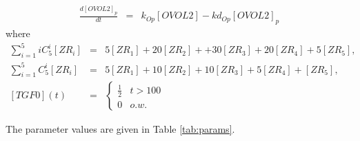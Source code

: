 \documentclass{article}
\begin{document}
{\begin{eqnarray*}
		\frac{d\left[OVOL2\right]_{p}}{dt} & = & k_{Op}\left[OVOL2\right]-kd_{Op}\left[OVOL2\right]_{p}
	\end{eqnarray*}
} where{\footnotesize{}
\begin{eqnarray*}
	\sum_{i=1}^{5}iC_{5}^{i}\left[ZR_{i}\right] & = & 5\left[ZR_{1}\right]+20\left[ZR_{2}\right]++30\left[ZR_{3}\right]+20\left[ZR_{4}\right]+5\left[ZR_{5}\right],\\
	\sum_{i=1}^{5}C_{5}^{i}\left[ZR_{i}\right] & = & 5\left[ZR_{1}\right]+10\left[ZR_{2}\right]+10\left[ZR_{3}\right]+5\left[ZR_{4}\right]+\left[ZR_{5}\right],\\
	\left[TGF0\right](t) & = & \begin{cases}
		\frac{1}{2} & t>100\\
		0 & o.w.
	\end{cases}
\end{eqnarray*}
}{\footnotesize \par}

The parameter values are given in Table \ref{tab:params}.
\end{document}

